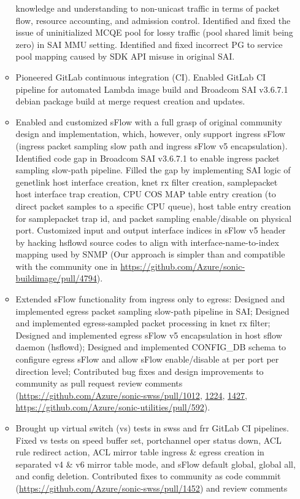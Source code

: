 \documentclass[letterpaper,11pt]{article}
\newcommand{\resitem}[1]{\item #1 \vspace{-2pt}}
\begin{document}
\begin{itemize}
\begin{itemize}
{  knowledge and understanding to
  non-unicast traffic in terms of packet flow, resource accounting, and admission control.
  Identified and fixed the issue of uninitialized MCQE pool for lossy traffic (pool shared limit being zero) in SAI MMU setting.
  Identified and fixed incorrect PG to service pool mapping caused by SDK API misuse in original SAI.}
  \resitem{Pioneered GitLab continuous integration (CI). Enabled GitLab CI pipeline for automated Lambda image build and Broadcom SAI v3.6.7.1 debian package build
  at merge request creation and updates.}
  \resitem{Enabled and customized sFlow with a full grasp of original community design and implementation,
  which, however, only support ingress sFlow (ingress packet sampling slow path and ingress sFlow v5 encapsulation).
  Identified code gap in Broadcom SAI v3.6.7.1 to enable ingress packet sampling slow-path pipeline.
  Filled the gap by implementing SAI logic of genetlink host interface creation, knet rx filter creation, samplepacket host interface trap creation,
  CPU COS MAP table entry creation (to direct packet samples to a specific CPU queue), host table entry creation for samplepacket trap id,
  and packet sampling enable/disable on physical port.
  Customized input and output interface indices in sFlow v5 header by hacking hsflowd source codes
  to align with interface-name-to-index mapping used by SNMP
  (Our approach is simpler than and compatible with the community one in \url{https://github.com/Azure/sonic-buildimage/pull/4794}).}
  \resitem{Extended sFlow functionality from ingress only to egress: Designed and implemented egress packet sampling slow-path pipeline in SAI;
  Designed and implemented egress-sampled packet processing in knet rx filter;
  Designed and implemented egress sFlow v5 encapsulation in host sflow daemon (hsflowd);
  Designed and implemented CONFIG\_DB schema to configure egress sFlow and allow sFlow enable/disable at per port per direction level;
  Contributed bug fixes and design improvements to community as pull request review comments (\url{https://github.com/Azure/sonic-swss/pull/1012},
  \url{1224}, \url{1427},
  \url{https://github.com/Azure/sonic-utilities/pull/592}).}
  \resitem{Brought up virtual switch (vs) tests in swss and frr GitLab CI pipelines.
  Fixed vs tests on speed buffer set, portchannel oper status down, ACL rule redirect action,
  ACL mirror table ingress \& egress creation in separated v4 \& v6 mirror table mode, and sFlow default global, global all, and config deletion.
  Contributed fixes to community as code commmit (\url{https://github.com/Azure/sonic-swss/pull/1452}) and review comments
}
\end{itemize}
\end{itemize}
\end{document}
